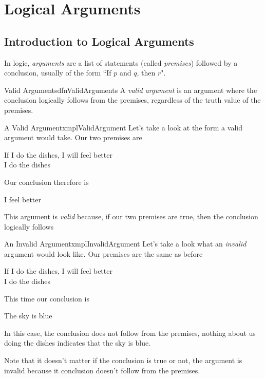 \chapter{Logical Arguments}
\label{chap:logicalArguments}
\section{Introduction to Logical Arguments}
In logic, \emph{arguments} are a list of statements (called \emph{premises}) followed by a conclusion, usually of the form ``If $p$ and $q$, then $r$".

\begin{dfn}[label={def:validArguments}]{Valid Arguments}{dfnValidArguments}
    A \emph{valid argument} is an argument where the conclusion logically follows from the premises, regardless of the truth value of the premises.
\end{dfn}

\begin{exmpl}[label={exmpl:validArgument}]{A Valid Argument}{xmplValidArgument}
    Let's take a look at the form a valid argument would take. Our two premises are
    \begin{center}
        If I do the dishes, I will feel better\\
        I do the dishes
    \end{center}
    Our conclusion therefore is
    \begin{center}
        I feel better
    \end{center}
    This argument is \emph{valid} because, if our two premises are true, then the conclusion logically follows
\end{exmpl}

\begin{exmpl}[label={exmpl:invalidArgument}]{An Invalid Argument}{xmplInvalidArgument}
    Let's take a look what an \emph{invalid} argument would look like. Our premises are the same as before
    \begin{center}
        If I do the dishes, I will feel better\\
        I do the dishes
    \end{center}
    This time our conclusion is
    \begin{center}
        The sky is blue
    \end{center}
    In this case, the conclusion does not follow from the premises, nothing about us doing the dishes indicates that the sky is blue.

    Note that it doesn't matter if the conclusion is true or not, the argument is invalid because it conclusion doesn't follow from the premises.
\end{exmpl}

